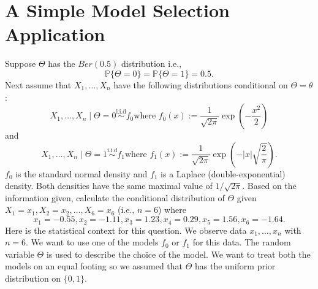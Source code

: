 \documentclass{scrartcl}
\renewcommand{\P}{{\mathbb P}}
\begin{document}
\section{A Simple Model Selection Application}
Suppose $\Theta$ has the $Ber(0.5)$ distribution i.e.,
\begin{equation*}
    \P\{\Theta = 0\} = \P \{\Theta = 1 \}  = 0.5. 
\end{equation*}
Next assume that $X_1, \dots, X_n$ have the following distributions
conditional on $\Theta = \theta$:
\begin{equation*}
X_1, \dots, X_n \mid \Theta = 0 \overset{\text{i.i.d}}{\sim} f_0
\text{where $f_0(x) := \frac{1}{\sqrt{2 \pi}} \exp
\left(-\frac{x^2}{2} \right)$} 
\end{equation*}
and 
\begin{equation*}
X_1, \dots, X_n \mid \Theta = 1 \overset{\text{i.i.d}}{\sim} f_1
\text{where $f_1(x) := \frac{1}{\sqrt{2 \pi}} \exp \left(-|x|
\sqrt{\frac{2}{\pi}} \right)$}. 
\end{equation*}
$f_0$ is the standard normal density and $f_1$ is a Laplace
(double-exponential) 
density. Both densities have the same maximal value of $1/\sqrt{2
\pi}$. Based on the information given, calculate the conditional
distribution of $\Theta$ given $X_1 = x_1, X_2 = x_2, \dots, X_6 =
x_6$ (i.e., $n = 6$) where
\begin{equation}\label{d1}
x_1 = -0.55, x_2 = -1.11, x_3 = 1.23, x_4 = 0.29, x_5 = 1.56, x_6 =
-1.64. 
\end{equation}
Here is the statistical context for this question. We observe data
$x_1, \dots, 
x_n$ with $n = 6$. We want to use one of the models $f_0$ or $f_1$ for
this data. The random variable $\Theta$ is used to describe the choice
of the model. We want to treat both the models on an equal footing so
we assumed that $\Theta$  has the uniform prior distribution
on $\{0, 1\}$. 
\end{document}
